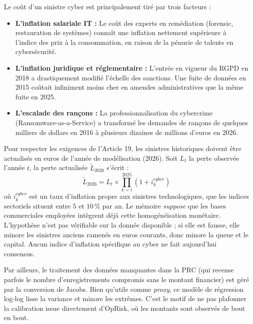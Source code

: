 Le coût d'un sinistre cyber est principalement tiré par trois facteurs :
\begin{itemize}
    \item \textbf{L'inflation salariale IT :} Le coût des experts en remédiation (forensic, restauration de systèmes) connaît une inflation nettement supérieure à l'indice des prix à la consommation, en raison de la pénurie de talents en cybersécurité.
    \item \textbf{L'inflation juridique et réglementaire :} L'entrée en vigueur du RGPD en 2018 a drastiquement modifié l'échelle des sanctions. Une fuite de données en 2015 coûtait infiniment moins cher en amendes administratives que la même fuite en 2025.
    \item \textbf{L'escalade des rançons :} La professionnalisation du cybercrime (Ransomware-as-a-Service) a transformé les demandes de rançons de quelques milliers de dollars en 2016 à plusieurs dizaines de millions d'euros en 2026.
\end{itemize}

Pour respecter les exigences de l'Article 19, les sinistres historiques doivent être actualisés en euros de l'année de modélisation (2026). Soit $L_t$ la perte observée l'année $t$, la perte actualisée $\tilde{L}_{2026}$ s'écrit :
\begin{equation}
\tilde{L}_{2026} = L_t \times \prod_{k=t}^{2025} (1 + i_k^{cyber})
\end{equation}
où $i_k^{cyber}$ est un taux d'inflation propre aux sinistres technologiques, que les indices
sectoriels situent entre $5$ et $10\,\%$ par an. Le mémoire \emph{suppose} que les bases
commerciales employées intègrent déjà cette homogénéisation monétaire. L'hypothèse n'est pas
vérifiable sur la donnée disponible ; si elle est fausse, elle minore les sinistres anciens
ramenés en euros courants, donc minore la queue et le capital. Aucun indice d'inflation
spécifique au cyber ne fait aujourd'hui consensus.

Par ailleurs, le traitement des données manquantes dans la PRC (qui recense parfois le nombre d'enregistrements compromis sans le montant financier) est géré par la conversion de Jacobs. Bien qu'utile comme \textit{proxy}, ce modèle de régression log-log lisse la variance et minore les extrêmes. C'est le motif de
ne pas plafonner la calibration issue directement d'OpRisk, où les montants sont observés de
bout en bout.


